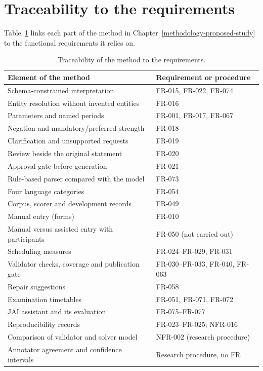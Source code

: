 \section{Traceability to the requirements}\label{consistency-with-the-srs-traceability}

Table~\ref{tab:trace} links each part of the method in Chapter~\ref{methodology-proposed-study} to the functional requirements it relies on.

\begin{longtable}[]{@{}p{}p{}@{}}
\caption{Traceability of the method to the requirements.}\label{tab:trace}\\
\toprule
Element of the method & Requirement or procedure \\
\midrule
\endhead
\bottomrule
\endlastfoot
Schema-constrained interpretation & FR-015, FR-022, FR-074 \\
Entity resolution without invented entities & FR-016 \\
Parameters and named periods & FR-001, FR-017, FR-067 \\
Negation and mandatory/preferred strength & FR-018 \\
Clarification and unsupported requests & FR-019 \\
Review beside the original statement & FR-020 \\
Approval gate before generation & FR-021 \\
Rule-based parser compared with the model & FR-073 \\
Four language categories & FR-054 \\
Corpus, scorer and development records & FR-049 \\
Manual entry (forms) & FR-010 \\
Manual versus assisted entry with participants & FR-050 (not carried out) \\
Scheduling measures & FR-024--FR-029, FR-031 \\
Validator checks, coverage and publication gate & FR-030--FR-033, FR-040, FR-063 \\
Repair suggestions & FR-058 \\
Examination timetables & FR-051, FR-071, FR-072 \\
JAI assistant and its evaluation & FR-075--FR-077 \\
Reproducibility records & FR-023--FR-025; NFR-016 \\
Comparison of validator and solver model & NFR-002 (research procedure) \\
Annotator agreement and confidence intervals & Research procedure, no FR \\
\end{longtable}
